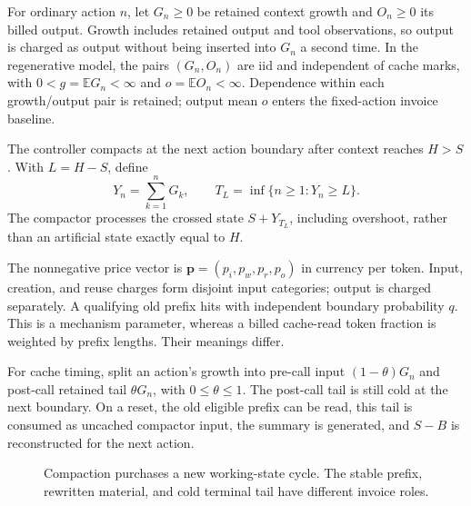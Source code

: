 \documentclass[sigconf,screen,nonacm]{acmart}
\newcommand{\E}{\mathbb{E}}
\newcommand{\pp}{\boldsymbol{p}}
\begin{document}
For ordinary action $n$, let $G_n\ge0$ be retained context growth and $O_n\ge0$
its billed output. Growth includes retained output and tool observations, so
output is charged as output without being inserted into $G_n$ a second time.
In the regenerative model, the pairs $(G_n,O_n)$ are iid and independent of
cache marks, with $0<g=\E G_n<\infty$ and $o=\E O_n<\infty$. Dependence within
each growth/output pair is retained; output mean $o$ enters the fixed-action
invoice baseline.

The controller compacts at the next action boundary after context reaches
$H>S$. With $L=H-S$, define
\begin{equation}
Y_n=\sum_{k=1}^nG_k,\qquad
T_L=\inf\{n\ge1:Y_n\ge L\}.
\label{eq:crossing}
\end{equation}
The compactor processes the crossed state $S+Y_{T_L}$, including overshoot,
rather than an artificial state exactly equal to $H$.

The nonnegative price vector is $\pp=(p_i,p_w,p_r,p_o)$ in currency per token. Input,
creation, and reuse charges form disjoint input categories; output is charged
separately. A qualifying old prefix hits with independent boundary probability
$q$. This is a mechanism parameter, whereas a billed cache-read token fraction
is weighted by prefix lengths. Their meanings differ.

For cache timing, split an action's growth into pre-call input
$(1-\theta)G_n$ and post-call retained tail $\theta G_n$, with $0\le\theta\le1$.
The post-call tail is still cold at the next boundary. On a reset, the old
eligible prefix can be read, this tail is consumed as uncached compactor input,
the summary is generated, and $S-B$ is reconstructed for the next action.

\begin{figure}[t]
\centering
{}
\caption{Compaction purchases a new working-state cycle. The stable prefix,
rewritten material, and cold terminal tail have different invoice roles.}
\label{fig:cycle}
\end{figure}
\end{document}
